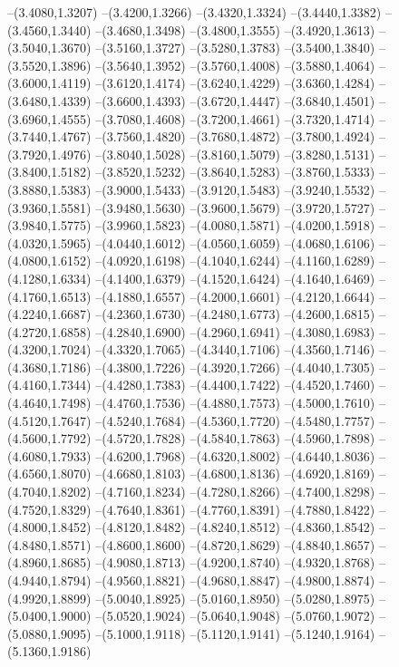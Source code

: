 {\begin{scope}
--(3.4080,1.3207)
--(3.4200,1.3266)
--(3.4320,1.3324)
--(3.4440,1.3382)
--(3.4560,1.3440)
--(3.4680,1.3498)
--(3.4800,1.3555)
--(3.4920,1.3613)
--(3.5040,1.3670)
--(3.5160,1.3727)
--(3.5280,1.3783)
--(3.5400,1.3840)
--(3.5520,1.3896)
--(3.5640,1.3952)
--(3.5760,1.4008)
--(3.5880,1.4064)
--(3.6000,1.4119)
--(3.6120,1.4174)
--(3.6240,1.4229)
--(3.6360,1.4284)
--(3.6480,1.4339)
--(3.6600,1.4393)
--(3.6720,1.4447)
--(3.6840,1.4501)
--(3.6960,1.4555)
--(3.7080,1.4608)
--(3.7200,1.4661)
--(3.7320,1.4714)
--(3.7440,1.4767)
--(3.7560,1.4820)
--(3.7680,1.4872)
--(3.7800,1.4924)
--(3.7920,1.4976)
--(3.8040,1.5028)
--(3.8160,1.5079)
--(3.8280,1.5131)
--(3.8400,1.5182)
--(3.8520,1.5232)
--(3.8640,1.5283)
--(3.8760,1.5333)
--(3.8880,1.5383)
--(3.9000,1.5433)
--(3.9120,1.5483)
--(3.9240,1.5532)
--(3.9360,1.5581)
--(3.9480,1.5630)
--(3.9600,1.5679)
--(3.9720,1.5727)
--(3.9840,1.5775)
--(3.9960,1.5823)
--(4.0080,1.5871)
--(4.0200,1.5918)
--(4.0320,1.5965)
--(4.0440,1.6012)
--(4.0560,1.6059)
--(4.0680,1.6106)
--(4.0800,1.6152)
--(4.0920,1.6198)
--(4.1040,1.6244)
--(4.1160,1.6289)
--(4.1280,1.6334)
--(4.1400,1.6379)
--(4.1520,1.6424)
--(4.1640,1.6469)
--(4.1760,1.6513)
--(4.1880,1.6557)
--(4.2000,1.6601)
--(4.2120,1.6644)
--(4.2240,1.6687)
--(4.2360,1.6730)
--(4.2480,1.6773)
--(4.2600,1.6815)
--(4.2720,1.6858)
--(4.2840,1.6900)
--(4.2960,1.6941)
--(4.3080,1.6983)
--(4.3200,1.7024)
--(4.3320,1.7065)
--(4.3440,1.7106)
--(4.3560,1.7146)
--(4.3680,1.7186)
--(4.3800,1.7226)
--(4.3920,1.7266)
--(4.4040,1.7305)
--(4.4160,1.7344)
--(4.4280,1.7383)
--(4.4400,1.7422)
--(4.4520,1.7460)
--(4.4640,1.7498)
--(4.4760,1.7536)
--(4.4880,1.7573)
--(4.5000,1.7610)
--(4.5120,1.7647)
--(4.5240,1.7684)
--(4.5360,1.7720)
--(4.5480,1.7757)
--(4.5600,1.7792)
--(4.5720,1.7828)
--(4.5840,1.7863)
--(4.5960,1.7898)
--(4.6080,1.7933)
--(4.6200,1.7968)
--(4.6320,1.8002)
--(4.6440,1.8036)
--(4.6560,1.8070)
--(4.6680,1.8103)
--(4.6800,1.8136)
--(4.6920,1.8169)
--(4.7040,1.8202)
--(4.7160,1.8234)
--(4.7280,1.8266)
--(4.7400,1.8298)
--(4.7520,1.8329)
--(4.7640,1.8361)
--(4.7760,1.8391)
--(4.7880,1.8422)
--(4.8000,1.8452)
--(4.8120,1.8482)
--(4.8240,1.8512)
--(4.8360,1.8542)
--(4.8480,1.8571)
--(4.8600,1.8600)
--(4.8720,1.8629)
--(4.8840,1.8657)
--(4.8960,1.8685)
--(4.9080,1.8713)
--(4.9200,1.8740)
--(4.9320,1.8768)
--(4.9440,1.8794)
--(4.9560,1.8821)
--(4.9680,1.8847)
--(4.9800,1.8874)
--(4.9920,1.8899)
--(5.0040,1.8925)
--(5.0160,1.8950)
--(5.0280,1.8975)
--(5.0400,1.9000)
--(5.0520,1.9024)
--(5.0640,1.9048)
--(5.0760,1.9072)
--(5.0880,1.9095)
--(5.1000,1.9118)
--(5.1120,1.9141)
--(5.1240,1.9164)
--(5.1360,1.9186)

\end{scope}}
